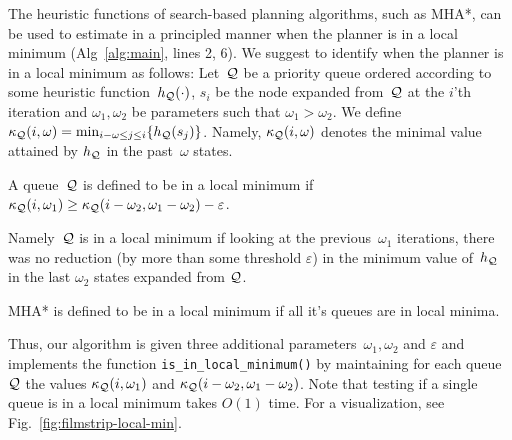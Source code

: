 \documentclass[conference]{IEEEtran}
\begin{document}


The heuristic functions of search-based planning algorithms, such as MHA*, can be used to estimate in a principled manner when the planner is in a local minimum (Alg~\ref{alg:main}, lines 2, 6). 
%
We suggest to identify when the planner is in a local minimum as follows:
Let~$\mathcal{Q}$ be a priority queue 
ordered according to some heuristic function~$h_{\mathcal{Q}}(\cdot)$,
$s_i$ be the node expanded from~$\mathcal{Q}$ at the $i$'th iteration and $\omega_1, \omega_2$ be parameters such that $\omega_1 > \omega_2$.
%
We define 
$\kappa_{\mathcal{Q}}(i, \omega) = \min_{i-\omega \leq j \leq i} \{ h_{\mathcal{Q}}(s_j)\}$.
Namely, $\kappa_{\mathcal{Q}}(i, \omega)$ denotes the minimal value attained by $h_{\mathcal{Q}}$ in the past~$\omega$ states. 
%
\begin{definition}
A queue~$\mathcal{Q}$ is defined to be in a local minimum if 
$\kappa_{\mathcal{Q}}(i, \omega_1) \geq \kappa_{\mathcal{Q}}(i - \omega_2, \omega_1 - \omega_2) - \varepsilon$.
\end{definition}
\noindent Namely~$\mathcal{Q}$ is in a local minimum if looking at the previous~$\omega_1$ iterations, 
there was no reduction 
(by more than some threshold $\varepsilon$) 
in the minimum value of~$h_{\mathcal{Q}}$ 
in the last $\omega_2$ states expanded from $\mathcal{Q}$.

\begin{definition}
MHA* is defined to be in a local minimum if 
all it's queues are in local minima.
\end{definition}

Thus, our algorithm is given three additional parameters~$\omega_1, \omega_2$ and $\varepsilon$ 
and implements the function \texttt{is\_in\_local\_minimum()} by maintaining for each queue~$\mathcal{Q}$ the values 
$\kappa_{\mathcal{Q}}(i, \omega_1)$ and $\kappa_{\mathcal{Q}}(i - \omega_2, \omega_1 - \omega_2)$.
Note that testing if a single queue is in a local minimum takes $O(1)$ time.
For a visualization, see Fig.~\ref{fig:filmstrip-local-min}.



%
\end{document}
